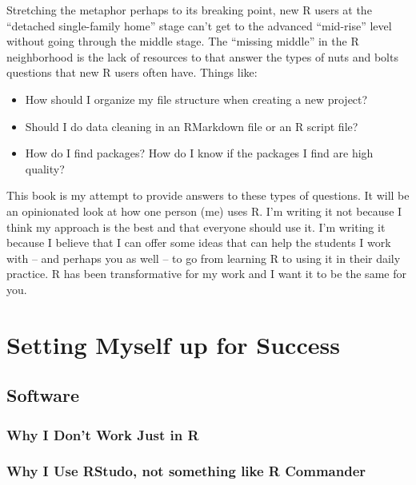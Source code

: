 \documentclass[]{book}
\providecommand{\tightlist}{%
  \setlength{\itemsep}{0pt}\setlength{\parskip}{0pt}}
\begin{document}
Stretching the metaphor perhaps to its breaking point, new R users at the ``detached single-family home'' stage can't get to the advanced ``mid-rise'' level without going through the middle stage. The ``missing middle'' in the R neighborhood is the lack of resources to that answer the types of nuts and bolts questions that new R users often have. Things like:

\begin{itemize}
\tightlist
\item
  How should I organize my file structure when creating a new project?
\item
  Should I do data cleaning in an RMarkdown file or an R script file?
\item
  How do I find packages? How do I know if the packages I find are high quality?
\end{itemize}

This book is my attempt to provide answers to these types of questions. It will be an opinionated look at how one person (me) uses R. I'm writing it not because I think my approach is the best and that everyone should use it. I'm writing it because I believe that I can offer some ideas that can help the students I work with -- and perhaps you as well -- to go from learning R to using it in their daily practice. R has been transformative for my work and I want it to be the same for you.

\hypertarget{setting-myself-up-for-success}{%
\chapter{Setting Myself up for Success}\label{setting-myself-up-for-success}}

\hypertarget{software}{%
\section{Software}\label{software}}

\hypertarget{why-i-dont-work-just-in-r}{%
\subsection{Why I Don't Work Just in R}\label{why-i-dont-work-just-in-r}}

\hypertarget{why-i-use-rstudo-not-something-like-r-commander}{%
\subsection{Why I Use RStudo, not something like R Commander}\label{why-i-use-rstudo-not-something-like-r-commander}}
\end{document}
